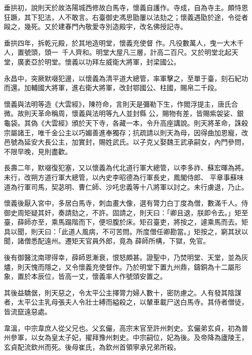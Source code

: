 \begin{pinyinscope}
 垂拱初，說則天於故洛陽城西修故白馬寺，懷義自護作。寺成，自為寺主。頗恃恩狂蹶，其下犯法，人不敢言。右臺御史馮思勖屢以法劾之；懷義遇勖於途，令從者毆之，幾死。又於建春門內敬愛寺別造殿宇，改名佛授記寺。



 垂拱四年，拆乾元殿，於其地造明堂，懷義充使督
 作。凡役數萬人，曳一大木千人，置號頭，頭一，千人齊和。明堂大屋凡三層，計高二百尺。又於明堂北起天堂，廣袤亞於明堂。懷義以功拜左威衛大將軍，封梁國公。



 永昌中，突厥默啜犯邊，以懷義為清平道大總管，率軍擊之，至單于臺，刻石紀功而還。加輔國大將軍，進右衛大將軍，改封鄂國公、柱國，賜帛二千段。



 懷義與法明等造《大雲經》，陳符命，言則天是彌勒下生，作閻浮提主，唐氏合微。故則天革命稱周，懷義與法明等九人並封縣
 公，賜物有差，皆賜紫袈娑、銀龜袋。其偽《大雲經》頒於天下寺，各藏一本，令升高座講說。則天將革命，誅殺宗屬諸王，唯千金公主以巧媚善進奉獨存；抗疏請以則天為母，因得曲加恩寵，改邑號為延安大長公主，加實封，賜姓武氏。以子克乂娶魏王武承嗣女，內門參問，不限早晚，見則盡歡。



 長壽二年，默啜復犯塞，又以懷義為代北道行軍大總管，以李多祚、蘇宏暉為將。未行，改朔方道行軍大總管，以內史李昭德為行軍長史，鳳閣侍郎、
 平章事蘇味道為行軍司馬，契苾明、曹仁師、沙吒忠義等十八將軍以討之。未行虜退，乃止。



 懷義後厭入宮中，多居白馬寺，刺血畫大像，選有膂力白丁度為僧，數滿千人。侍御史周矩疑其奸，奏請劾之，不許。固請之，則天曰：「卿且退，朕即令去。」矩至臺，薛師亦至，乘馬蹋階而下，便坦腹於床。矩召臺吏，將按之，遽乘馬而去。矩具以聞，則天曰：「此道人風病，不可苦問。所度僧任卿勘當。」矩按之，窮其狀以聞，諸僧悉配遠州。遷矩天官員外郎，竟為
 薛師所構，下獄，免官。



 後有御醫沈南璆得幸，薛師恩漸衰，恨怒頗甚。證聖中，乃焚明堂、天堂，並為灰燼，則天愧而隱之，又令懷義充使督作。乃於明堂下置九州鼎，鑄銅為十二屬形象，置於本辰位，皆高一丈，懷義率人作號頭安置之。



 其後益驕倨，則天惡之，令太平公主擇膂力婦人數十，密防慮之。人有發其陰謀者，太平公主乳母張夫人令壯士縛而縊殺之，以輦車載尸送白馬寺。其侍者僧徒，皆流竄遠惡處。



 韋溫，中宗韋庶人從父兄也。父玄儼，高宗末官至許州刺史。玄儼弟玄貞，初為普州參軍，以女為皇太子妃，擢拜豫州刺史。中宗嗣位，妃為後。及帝降為廬陵王，玄貞配流欽州而死。後母崔氏，為欽州首領寧承兄弟所殺。




\end{pinyinscope}
